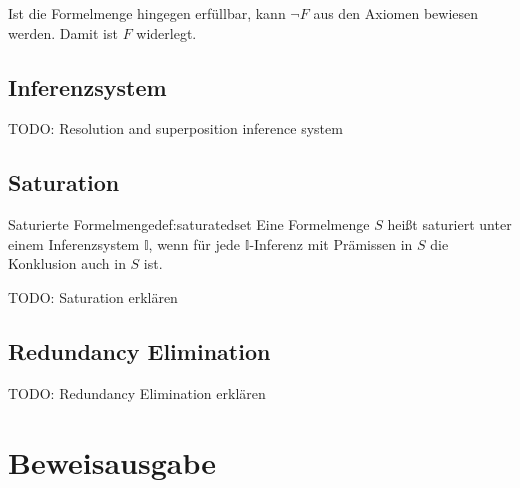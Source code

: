 \documentclass{article}
\begin{document}
Ist die Formelmenge hingegen erfüllbar, kann $\neg F$ aus den Axiomen bewiesen werden.
Damit ist $F$ widerlegt. \cite[S. 7]{cav2013}

\subsection{Inferenzsystem}
\label{subsec:inference}
TODO: Resolution and superposition inference system

\subsection{Saturation}
\label{subsec:saturation}


\begin{definition}{Saturierte Formelmenge}{def:saturatedset}
	Eine Formelmenge $S$ heißt saturiert unter einem Inferenzsystem $\mathds{I}$, wenn für jede $\mathds{I}$-Inferenz mit Prämissen in $S$ die Konklusion auch in $S$ ist.
\end{definition}

TODO: Saturation erklären

\subsection{Redundancy Elimination}
\label{subsec:redund}

TODO: Redundancy Elimination erklären

\section{Beweisausgabe}
\label{sec:output}
\end{document}
